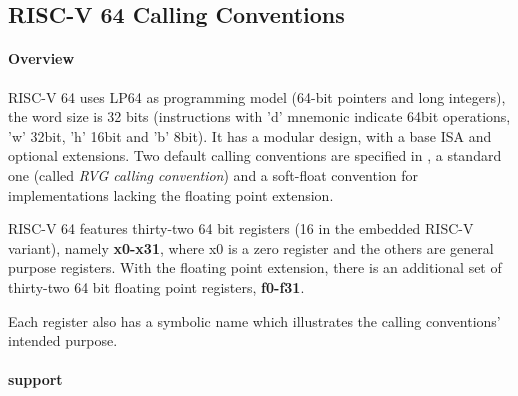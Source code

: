 %
%
%
%

\subsection{RISC-V 64 Calling Conventions}

\paragraph{Overview}

RISC-V 64 uses LP64 as programming model (64-bit pointers and long integers),
the word size is 32 bits (instructions with 'd' mnemonic indicate 64bit
operations, 'w' 32bit, 'h' 16bit and 'b' 8bit). It has a modular design, with a
base ISA and optional extensions. Two default calling conventions are specified
in \cite{riscvcc}, a standard one (called \emph{RVG calling convention}) and a
soft-float convention for implementations lacking the floating point extension.

RISC-V 64 features thirty-two 64 bit registers (16 in the embedded RISC-V
variant), namely {\bf x0-x31}, where x0 is a zero register and the others are
general purpose registers.
With the floating point extension, there is an additional set of thirty-two 64
bit floating point registers, {\bf f0-f31}.

Each register also has a symbolic name which illustrates the calling
conventions' intended purpose.

\paragraph{ support}

